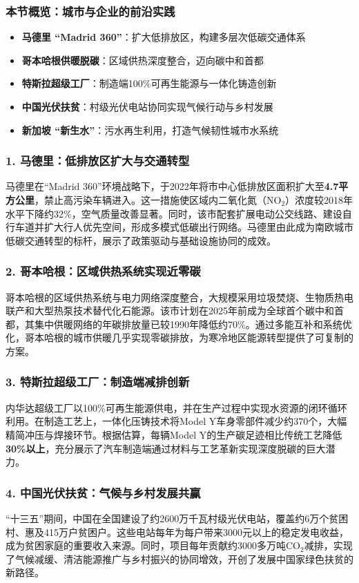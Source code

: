 \documentclass[11pt]{beamer}
\begin{document}
\begin{frame}
\frametitle{本节概览：城市与企业的前沿实践}
\begin{itemize}
  \item \textbf{马德里 “Madrid 360”}：扩大低排放区，构建多层次低碳交通体系
  \item \textbf{哥本哈根供暖脱碳}：区域供热深度整合，迈向碳中和首都
  \item \textbf{特斯拉超级工厂}：制造端100\%可再生能源与一体化铸造创新
  \item \textbf{中国光伏扶贫}：村级光伏电站协同实现气候行动与乡村发展
  \item \textbf{新加坡 “新生水”}：污水再生利用，打造气候韧性城市水系统
\end{itemize}
\end{frame}

\begin{frame}
\frametitle{1. 马德里：低排放区扩大与交通转型}
马德里在“Madrid 360”环境战略下，于2022年将市中心低排放区面积扩大至\textbf{4.7平方公里}，禁止高污染车辆进入。这一措施使区域内二氧化氮（NO$_2$）浓度较2018年水平下降约\alert{32\%}，空气质量改善显著。同时，该市配套扩展电动公交线路、建设自行车道并扩大行人优先空间，形成多模式低碳出行网络。马德里由此成为南欧城市低碳交通转型的标杆，展示了政策驱动与基础设施协同的成效。
\end{frame}

\begin{frame}
\frametitle{2. 哥本哈根：区域供热系统实现近零碳}
哥本哈根的区域供热系统与电力网络深度整合，大规模采用\alert{垃圾焚烧、生物质热电联产和大型热泵}技术替代化石能源。该市计划在2025年前成为全球首个碳中和首都，其集中供暖网络的年碳排放量已较1990年降低约\alert{70\%}。通过多能互补和系统优化，哥本哈根的城市供暖几乎实现零碳排放，为寒冷地区能源转型提供了可复制的方案。
\end{frame}

\begin{frame}
\frametitle{3. 特斯拉超级工厂：制造端减排创新}
内华达超级工厂以\alert{100\%可再生能源}供电，并在生产过程中实现水资源的闭环循环利用。在制造工艺上，一体化压铸技术将Model Y车身零部件减少约\alert{370个}，大幅精简冲压与焊接环节。根据估算，每辆Model Y的生产碳足迹相比传统工艺降低\textbf{30\%以上}，充分展示了汽车制造端通过材料与工艺革新实现深度脱碳的巨大潜力。
\end{frame}

\begin{frame}
\frametitle{4. 中国光伏扶贫：气候与乡村发展共赢}
“十三五”期间，中国在全国建设了约\alert{2600万千瓦}村级光伏电站，覆盖约6万个贫困村、惠及415万户贫困户。这些电站每年为每户带来\alert{3000元以上}的稳定发电收益，成为贫困家庭的重要收入来源。同时，项目每年贡献约3000多万吨CO$_2$减排，实现了气候减缓、清洁能源推广与乡村振兴的协同增效，开创了发展中国家绿色扶贫的新路径。
\end{frame}
\end{document}
